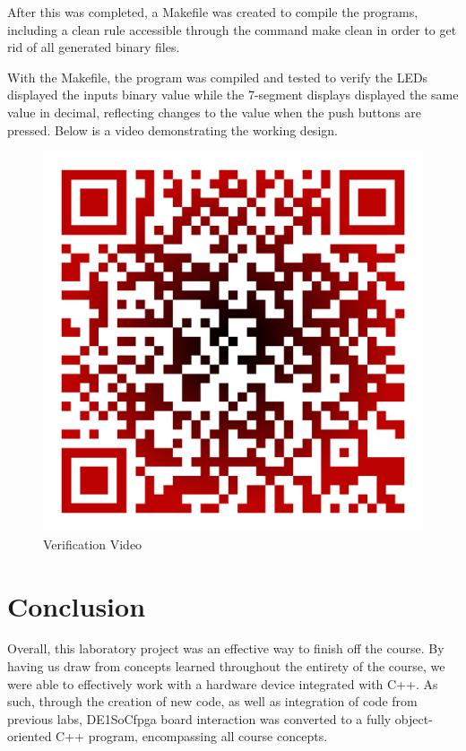 \documentclass[
	letterpaper, %
	10pt, %
]{CSUniSchoolLabReport}
\begin{document}
After this was completed, a Makefile was created to compile the programs, including a clean rule accessible through the command make clean in order to get rid of all generated binary files.



With the Makefile, the program was compiled and tested to verify the LEDs displayed the inputs binary value while the 7-segment displays displayed the same value in decimal, reflecting changes to the value when the push buttons are pressed. Below is a video demonstrating the working design. 

\begin{figure}[h!]
  \centering
  \includegraphics[width=.55\textwidth]{Figures/Video2.png}
  \caption{Verification Video}
  \label{fig:2}
\end{figure}

\section{Conclusion}

Overall, this laboratory project was an effective way to finish off the course. By having us draw from concepts learned throughout the entirety of the course, we were able to effectively work with a hardware device integrated with C++. As such, through the creation of new code, as well as integration of code from previous labs, DE1SoCfpga board interaction was converted to a fully object-oriented C++ program, encompassing all course concepts.
\end{document}
